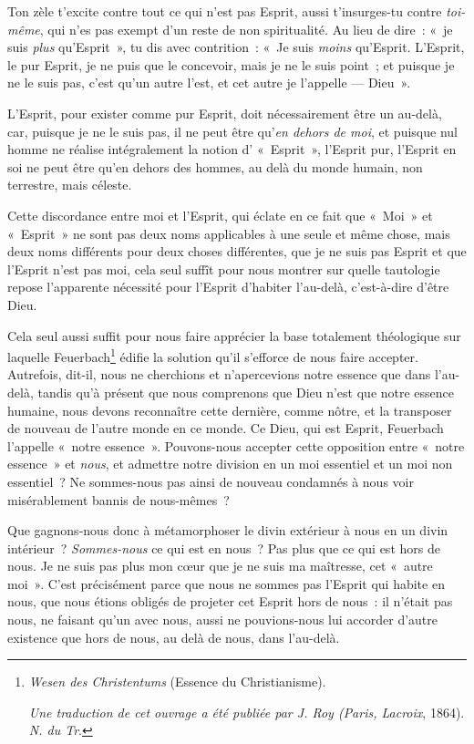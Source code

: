 \documentclass[french,twoside]{book} %
\begin{document}
Ton zèle t’excite contre tout ce qui n’est pas Esprit, aussi t’insurges-tu contre \emph{toi-même}, qui n’es pas exempt d’un reste de non spiritualité. Au lieu de dire : « je suis \emph{plus} qu’Esprit », tu dis avec contrition : « Je suis \emph{moins} qu’Esprit. L’Esprit, le pur Esprit, je ne puis que le concevoir, mais je ne le suis point ; et puisque je ne le suis pas, c’est qu’un autre l’est, et cet autre je l’appelle — Dieu ».\par
L’Esprit, pour exister comme pur Esprit, doit nécessairement être un au-delà, car, puisque je ne le suis pas, il ne peut être qu’\emph{en dehors de moi}, et puisque nul homme ne réalise intégralement la notion d’ « Esprit », l’Esprit pur, l’Esprit en soi ne peut être qu’en dehors des hommes, au delà du monde humain, non terrestre, mais céleste.\par
Cette discordance entre moi et l’Esprit, qui éclate en ce fait que « Moi » et « Esprit » ne sont pas deux noms applicables à une seule et même chose, mais deux noms différents pour deux choses différentes, que je ne suis pas Esprit et que l’Esprit n’est pas moi, cela seul suffît pour nous montrer sur quelle tautologie repose l’apparente nécessité pour l’Esprit  d’habiter l’au-delà, c’est-à-dire d’être Dieu.\par
Cela seul aussi suffit pour nous faire apprécier la base totalement théologique sur laquelle Feuerbach\footnote{ \noindent \emph{Wesen des Christentums} (Essence du Christianisme).\par
 \emph{Une traduction de cet ouvrage a été publiée par J. Roy (Paris, Lacroix}, 1864). \emph{N. du Tr}.
 } édifie la solution qu’il s’efforce de nous faire accepter. Autrefois, dit-il, nous ne cherchions et n’apercevions notre essence que dans l’au-delà, tandis qu’à présent que nous comprenons que Dieu n’est que notre essence humaine, nous devons reconnaître cette dernière, comme nôtre, et la transposer de nouveau de l’autre monde en ce monde. Ce Dieu, qui est Esprit, Feuerbach l’appelle « notre essence ». Pouvons-nous accepter cette opposition entre « notre essence » et \emph{nous}, et admettre notre division en un moi essentiel et un moi non essentiel ? Ne sommes-nous pas ainsi de nouveau condamnés à nous voir misérablement bannis de nous-mêmes ?\par
Que gagnons-nous donc à métamorphoser le divin extérieur à nous en un divin intérieur ? \emph{Sommes-nous} ce qui est en nous ? Pas plus que ce qui est hors de nous. Je ne suis pas plus mon cœur que je ne suis ma maîtresse, cet « autre moi ». C’est précisément parce que nous ne sommes pas l’Esprit qui habite en nous, que nous étions obligés de projeter cet Esprit hors de nous : il n’était pas nous, ne faisant qu’un avec nous, aussi ne pouvions-nous lui accorder d’autre existence que hors de nous, au delà de nous, dans l’au-delà.\par
\end{document}
